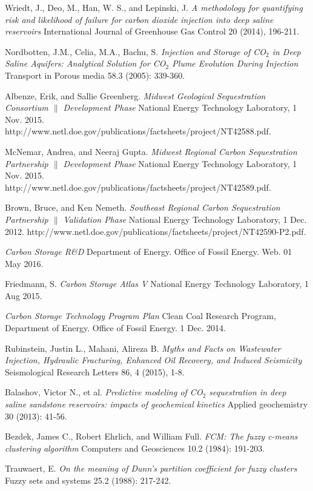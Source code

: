 \documentclass[letterpaper, 12pt]{article}
\begin{document}
\begin{thebibliography}{9}

Wriedt, J., Deo, M., Han, W. S., and Lepinski, J.
\textit{A methodology for quantifying risk and likelihood of failure for carbon dioxide injection into deep saline reservoirs}
International Journal of Greenhouse Gas Control 20 (2014), 196-211.

Nordbotten, J.M., Celia, M.A., Bachu, S.
\textit{Injection and Storage of CO$_2$ in Deep Saline Aquifers: Analytical Solution for CO$_2$ Plume Evolution During Injection}
Transport in Porous media 58.3 (2005): 339-360.

Albenze, Erik, and Sallie Greenberg. 
\textit{Midwest Geological Sequestration Consortium $\|$ Development Phase}
National Energy Technology Laboratory, 1 Nov. 2015. http://www.netl.doe.gov/publications/factsheets/project/NT42588.pdf.

McNemar, Andrea, and Neeraj Gupta. 
\textit{Midwest Regional Carbon Sequestration Partnership $\|$ Development Phase}
National Energy Technology Laboratory, 1 Nov. 2015. http://www.netl.doe.gov/publications/factsheets/project/NT42589.pdf.

Brown, Bruce, and Ken Nemeth. 
\textit{Southeast Regional Carbon Sequestration Partnership $\|$ Validation Phase}
National Energy Technology Laboratory, 1 Dec. 2012. http://www.netl.doe.gov/publications/factsheets/project/NT42590-P2.pdf.

\textit{Carbon Storage R\&D} Department of Energy. Office of Fossil Energy. Web. 01 May 2016.

Friedmann, S. 
\textit{Carbon Storage Atlas V} 
National Energy Technology Laboratory, 1 Aug 2015.

\textit{Carbon Storage Technology Program Plan}
Clean Coal Research Program, Department of Energy. Office of Fossil Energy. 1 Dec. 2014.

Rubinstein, Justin L., Mahani, Alireza B.
\textit{Myths and Facts on Wastewater Injection, Hydraulic Fracturing, Enhanced Oil Recovery, and Induced Seismicity}
Seismological Research Letters 86, 4 (2015), 1-8. 

Balashov, Victor N., et al.
\textit{Predictive modeling of CO$_2$ sequestration in deep saline sandstone reservoirs: impacts of geochemical kinetics}
Applied geochemistry 30 (2013): 41-56.

Bezdek, James C., Robert Ehrlich, and William Full.
\textit{FCM: The fuzzy c-means clustering algorithm}
Computers and Geosciences 10.2 (1984): 191-203.

Trauwaert, E. 
\textit{On the meaning of Dunn's partition coefficient for fuzzy clusters}
Fuzzy sets and systems 25.2 (1988): 217-242.

\end{thebibliography}
\end{document}

